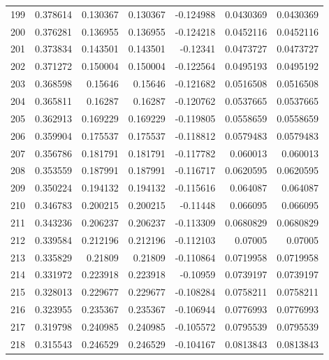 \begin{tabular}{rrrrrrr}
 199 &  0.378614    & 0.130367    & 0.130367    & -0.124988    & 0.0430369   & 0.0430369   \\
 200 &  0.376281    & 0.136955    & 0.136955    & -0.124218    & 0.0452116   & 0.0452116   \\
 201 &  0.373834    & 0.143501    & 0.143501    & -0.12341     & 0.0473727   & 0.0473727   \\
 202 &  0.371272    & 0.150004    & 0.150004    & -0.122564    & 0.0495193   & 0.0495192   \\
 203 &  0.368598    & 0.15646     & 0.15646     & -0.121682    & 0.0516508   & 0.0516508   \\
 204 &  0.365811    & 0.16287     & 0.16287     & -0.120762    & 0.0537665   & 0.0537665   \\
 205 &  0.362913    & 0.169229    & 0.169229    & -0.119805    & 0.0558659   & 0.0558659   \\
 206 &  0.359904    & 0.175537    & 0.175537    & -0.118812    & 0.0579483   & 0.0579483   \\
 207 &  0.356786    & 0.181791    & 0.181791    & -0.117782    & 0.060013    & 0.060013    \\
 208 &  0.353559    & 0.187991    & 0.187991    & -0.116717    & 0.0620595   & 0.0620595   \\
 209 &  0.350224    & 0.194132    & 0.194132    & -0.115616    & 0.064087    & 0.064087    \\
 210 &  0.346783    & 0.200215    & 0.200215    & -0.11448     & 0.066095    & 0.066095    \\
 211 &  0.343236    & 0.206237    & 0.206237    & -0.113309    & 0.0680829   & 0.0680829   \\
 212 &  0.339584    & 0.212196    & 0.212196    & -0.112103    & 0.07005     & 0.07005     \\
 213 &  0.335829    & 0.21809     & 0.21809     & -0.110864    & 0.0719958   & 0.0719958   \\
 214 &  0.331972    & 0.223918    & 0.223918    & -0.10959     & 0.0739197   & 0.0739197   \\
 215 &  0.328013    & 0.229677    & 0.229677    & -0.108284    & 0.0758211   & 0.0758211   \\
 216 &  0.323955    & 0.235367    & 0.235367    & -0.106944    & 0.0776993   & 0.0776993   \\
 217 &  0.319798    & 0.240985    & 0.240985    & -0.105572    & 0.0795539   & 0.0795539   \\
 218 &  0.315543    & 0.246529    & 0.246529    & -0.104167    & 0.0813843   & 0.0813843   \\

\end{tabular}
